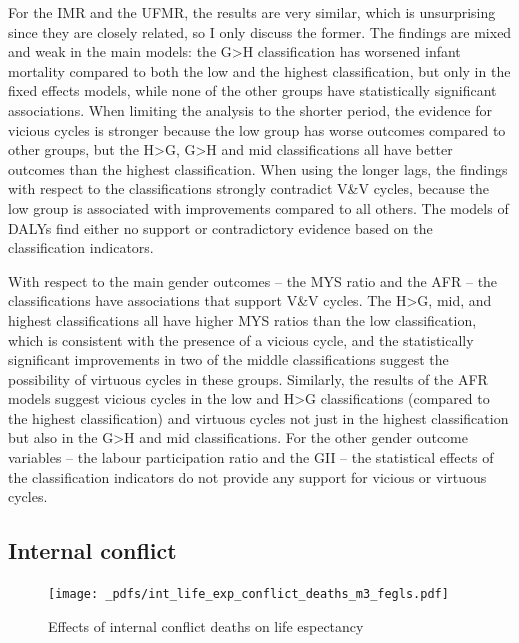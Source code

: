 \documentclass[12pt]{article}
\begin{document}
For the IMR and the UFMR, the results are very similar, which is unsurprising since they are closely related, so I only discuss the former. The findings are mixed and weak in the main models: the G>H classification has worsened infant mortality compared to both the low and the highest classification, but only in the fixed effects models, while none of the other groups have statistically significant associations. When limiting the analysis to the shorter period, the evidence for vicious cycles is stronger because the low group has worse outcomes compared to other groups, but the H>G, G>H and mid classifications all have better outcomes than the highest classification. When using the longer lags, the findings with respect to the classifications strongly contradict V\&V cycles, because the low group is associated with improvements compared to all others. The models of DALYs find either no support or contradictory evidence based on the classification indicators.

With respect to the main gender outcomes -- the MYS ratio and the AFR -- the classifications have associations that support V\&V cycles. The H>G, mid, and highest classifications all have higher MYS ratios than the low classification, which is consistent with the presence of a vicious cycle, and the statistically significant improvements in two of the middle classifications suggest the possibility of virtuous cycles in these groups. Similarly, the results of the AFR models suggest vicious cycles in the low and H>G classifications (compared to the highest classification) and virtuous cycles not just in the highest classification but also in the G>H and mid classifications.
For the other gender outcome variables -- the labour participation ratio and the GII -- the statistical effects of the classification indicators do not provide any support for vicious or virtuous cycles.

\subsection{Internal conflict}

\begin{figure}[!htb]
    \centering
    \caption{Effects of internal conflict deaths on life espectancy}
    \label{int_life_exp_conflict_deaths}
    \texttt{[image: \_pdfs/int\_life\_exp\_conflict\_deaths\_m3\_fegls.pdf]}
\end{figure}
\end{document}
